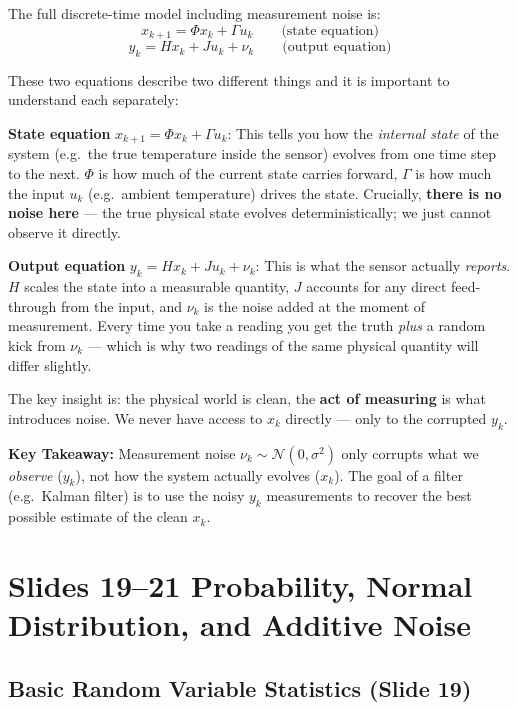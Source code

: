 \documentclass[12pt, a4paper]{article}
\begin{document}
The full discrete-time model including measurement noise is:
\[
  x_{k+1} = \Phi x_k + \Gamma u_k \qquad \text{(state equation)}
\]
\[
  y_k = H x_k + J u_k + \nu_k \qquad \text{(output equation)}
\]

These two equations describe two different things and it is important
to understand each separately:

\textbf{State equation} $x_{k+1} = \Phi x_k + \Gamma u_k$:
This tells you how the \emph{internal state} of the system (e.g.\
the true temperature inside the sensor) evolves from one time step
to the next. $\Phi$ is how much of the current state carries forward,
$\Gamma$ is how much the input $u_k$ (e.g.\ ambient temperature) drives
the state. Crucially, \textbf{there is no noise here} --- the true
physical state evolves deterministically; we just cannot observe it
directly.

\textbf{Output equation} $y_k = H x_k + J u_k + \nu_k$:
This is what the sensor actually \emph{reports}. $H$ scales the state
into a measurable quantity, $J$ accounts for any direct feed-through
from the input, and $\nu_k$ is the noise added at the moment of
measurement. Every time you take a reading you get the truth
\emph{plus} a random kick from $\nu_k$ --- which is why two readings
of the same physical quantity will differ slightly.

The key insight is: the physical world is clean, the \textbf{act of
measuring} is what introduces noise. We never have access to $x_k$
directly --- only to the corrupted $y_k$.

\begin{keybox}
  \textbf{Key Takeaway:} Measurement noise $\nu_k \sim \mathcal{N}(0,\sigma^2)$
  only corrupts what we \emph{observe} ($y_k$), not how the system
  actually evolves ($x_k$). The goal of a filter (e.g.\ Kalman filter)
  is to use the noisy $y_k$ measurements to recover the best possible
  estimate of the clean $x_k$.
\end{keybox}

\section*{Slides 19--21 \quad Probability, Normal Distribution, and Additive Noise}

\subsection*{Basic Random Variable Statistics (Slide 19)}
\end{document}
